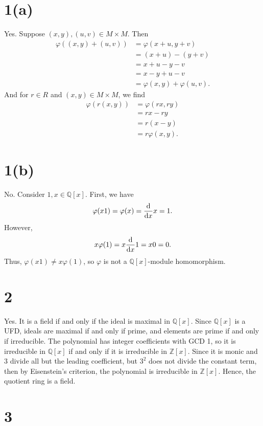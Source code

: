 \documentclass[12pt]{article}
\theoremstyle{definition}
\newcommand{\Z}{\mathbb{Z}}
\newcommand{\Q}{\mathbb{Q}}
\renewcommand{\phi}{\varphi}
\begin{document}
\thispagestyle{title}


\section*{1(a)}

Yes. Suppose $(x, y), (u, v) \in M \times M$. Then
\begin{align*}
    \phi((x,y) + (u,v)) 
        &= \phi(x+u, y+v) \\
        &= (x+u) - (y+v) \\
        &= x + u - y - v \\
        &= x - y + u - v \\
        &= \phi(x, y) + \phi(u, v).
\end{align*}
And for $r \in R$ and $(x, y) \in M \times M$, we find
\begin{align*}
    \phi(r(x, y))
        &= \phi(rx, ry) \\
        &= rx - ry \\
        &= r(x - y) \\
        &= r\phi(x, y).
\end{align*}

\section*{1(b)}

No. Consider $1, x \in \Q[x]$. First, we have
\[
    \phi(x1)
        = \phi(x)
        = \dv{x} x
        = 1.
\]
However,
\[
    x\phi(1)
        = x\dv{x}1
        = x0
        = 0.
\]
Thus, $\phi(x1) \ne x\phi(1)$, so $\phi$ is not a $\Q[x]$-module homomorphism.


\section*{2}

Yes. It is a field if and only if the ideal is maximal in $\Q[x]$. Since $\Q[x]$ is a UFD, ideals are maximal if and only if prime, and elements are prime if and only if irreducible. The polynomial has integer coefficients with GCD 1, so it is irreducible in $\Q[x]$ if and only if it is irreducible in $\Z[x]$. Since it is monic and $3$ divide all but the leading coefficient, but $3^2$ does not divide the constant term, then by Eisenstein's criterion, the polynomial is irreducible in $\Z[x]$. Hence, the quotient ring is a field.


\newpage
\section*{3}
\end{document}
